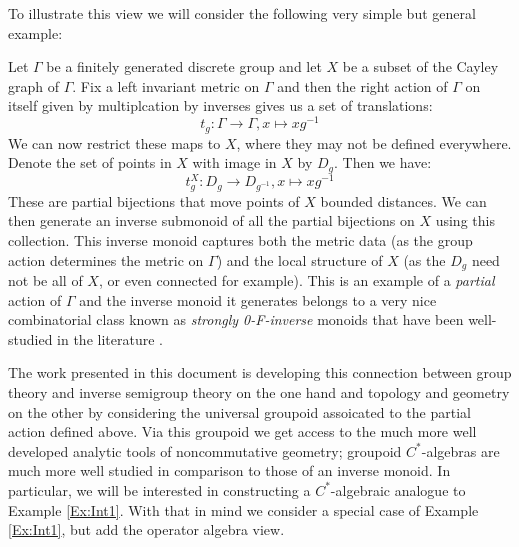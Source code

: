 To illustrate this view we will consider the following very simple but general example:
\begin{example}\label{Ex:Int1}
Let $\Gamma$ be a finitely generated discrete group and let $X$ be a subset of the Cayley graph of $\Gamma$. Fix a left invariant metric on $\Gamma$ and then the right action of $\Gamma$ on itself given by multiplcation by inverses gives us a set of translations:
\begin{equation*}
t_{g}: \Gamma \rightarrow \Gamma , x \mapsto xg^{-1}
\end{equation*}
We can now restrict these maps to $X$, where they may not be defined everywhere. Denote the set of points in $X$ with image in $X$ by $D_{g}$. Then we have:
\begin{equation*}
t_{g}^{X}: D_{g} \rightarrow D_{g^{-1}} , x \mapsto xg^{-1}
\end{equation*}
These are partial bijections that move points of $X$ bounded distances. We can then generate an inverse submonoid of all the partial bijections on $X$ using this collection. This inverse monoid captures both the metric data (as the group action determines the metric on $\Gamma$) and the local structure of $X$ (as the $D_{g}$ need not be all of $X$, or even connected for example). This is an example of a \textit{partial} action of $\Gamma$ and the inverse monoid it generates belongs to a very nice combinatorial class known as \textit{strongly 0-F-inverse} monoids that have been well-studied in the literature \cite{MR1721768,MR1798993,Nor-2012}.
\end{example}

The work presented in this document is developing this connection between group theory and inverse semigroup theory on the one hand and topology and geometry on the other by considering the universal groupoid assoicated to the partial action defined above. Via this groupoid we get access to the much more well developed analytic tools of noncommutative geometry; groupoid $C^{*}$-algebras are much more well studied in comparison to those of an inverse monoid. In particular, we will be interested in constructing a $C^{*}$-algebraic analogue to Example \ref{Ex:Int1}. With that in mind we consider a special case of Example \ref{Ex:Int1}, but add the operator algebra view.

